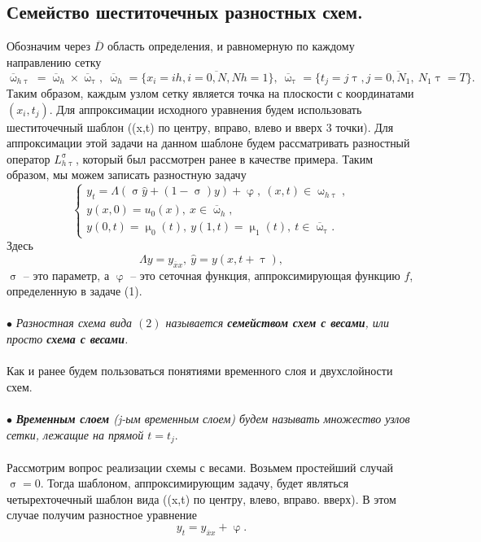 \documentclass[a4paper, 12pt]{report}
\numberwithin{equation}{section}
\newcommand{\ol}{\overline}
\renewcommand{\varphi}{\upvarphi}
\renewcommand{\tau}{\uptau}
\renewcommand{\sigma}{\upsigma}
\renewcommand{\mu}{\upmu}
\renewcommand{\omega}{\upomega}
\begin{document}
		\subsection{Семейство шеститочечных разностных схем.}
		Обозначим через $\ol D$ область определения, и равномерную по каждому направлению сетку
		$$\ol\omega_{h\tau} = \ol \omega_h \times \ol \omega_\tau,\ \ol \omega_h = \{x_i = ih, i = \ol{0,N}, Nh = 1\}, \ \ol \omega_\tau = \{t_j = j\tau,j=\ol{0,N_1},\ N_1\tau=T\}.$$
		Таким образом, каждым узлом сетку является точка на плоскости с координатами $(x_i, t_j)$. Для аппроксимации исходного уравнения будем использовать шеститочечный шаблон
		((x,t) по центру, вправо, влево и вверх 3 точки).
		Для аппроксимации этой задачи на данном шаблоне будем рассматривать разностный оператор $L^{\sigma}_{h\tau}$, который был рассмотрен ранее в качестве примера. Таким образом, мы можем записать разностную задачу
		\begin{equation}
			\begin{cases}
				y_t = \Lambda(\sigma \hat y + (1-\sigma)y)+\varphi,\ (x,t)\in \omega_{h\tau},\\
				y(x,0) = u_0(x),\ x \in \ol \omega_h,\\
				y(0, t) = \mu_0(t),\ y(1,t) = \mu_1(t),\ t \in \ol \omega_\tau.
			\end{cases}
		\end{equation}
		Здесь $$\Lambda y = y_{\ol x x},\ \hat y = y(x, t+\tau),$$
		$\sigma$ -- это параметр, а $\varphi$ -- это сеточная функция, аппроксимирующая функцию $f$, определенную в задаче (1).\\\\
		$\bullet$ \textit{Разностная схема вида $(2)$ называется \textbf{семейством схем с весами}, или просто \textbf{схема с весами}.}
		\\\\
		Как и ранее будем пользоваться понятиями временного слоя и двухслойности схем.\\\\
		$\bullet$ \textit{\textbf{Временным слоем} (j-ым временным слоем) будем называть множество узлов сетки, лежащие на прямой $t = t_j$}.\\\\
		Рассмотрим вопрос реализации схемы с весами. Возьмем простейший случай $\sigma = 0$. Тогда шаблоном, аппроксимирующим задачу, будет являться четырехточечный шаблон вида ((x,t) по центру, влево, вправо. вверх). В этом случае получим разностное уравнение
		\begin{equation}
			y_t = y_{\ol x x} + \varphi.
		\end{equation}
\end{document}
